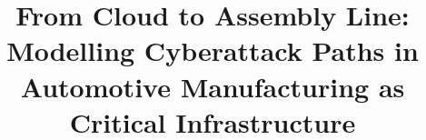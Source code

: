 \documentclass[review,times]{elsarticle}
\begin{document}
\begin{frontmatter}

\title{From Cloud to Assembly Line: Modelling Cyberattack Paths in Automotive
Manufacturing as Critical Infrastructure}

\begin{abstract}
\capmabstract
\end{abstract}



\begin{keyword}
\capmkeywords
\end{keyword}

\end{frontmatter}







\end{document}
